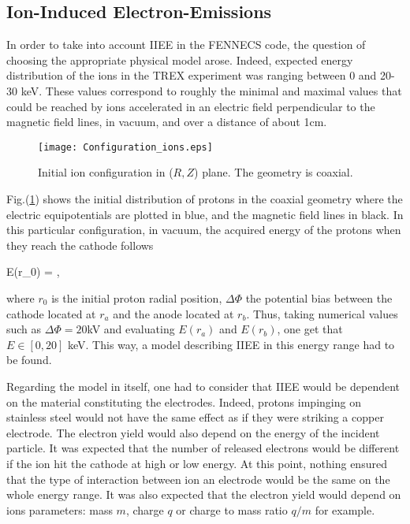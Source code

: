 \subsection{Ion-Induced Electron-Emissions}

In order to take into account IIEE in the FENNECS code, the question of choosing the appropriate physical model arose. Indeed, expected energy distribution of the ions in the TREX experiment was ranging between 0 and 20-30 keV. These values correspond to roughly the minimal and maximal values that could be reached by ions accelerated in an electric field perpendicular to the magnetic field lines, in vacuum, and over a distance of about 1cm.
 
\begin{figure}[h!]
\centering
	\texttt{[image: Configuration\_ions.eps]}
	\caption{\label{Config_ions} Initial ion configuration in ($R,Z$) plane. The geometry is coaxial.}
\end{figure}  

\noindent Fig.(\ref{Config_ions}) shows the initial distribution of protons in the coaxial geometry where the electric equipotentials are plotted in blue, and the magnetic field lines in black. In this particular configuration, in vacuum, the acquired energy of the protons when they reach the cathode follows 

\beq
E(r_0) = \Delta \Phi {},      
\eeq

\noindent where $r_0$ is the initial proton radial position, $\Delta \Phi$ the potential bias between the cathode located at $r_a$ and the anode located at $r_b$. Thus, taking numerical values such as $\Delta \Phi = 20$kV and evaluating $E(r_a)$ and $E(r_b)$, one get that $E\in [0,20]$ keV. This way, a model describing IIEE in this energy range had to be found. 

\noindent Regarding the model in itself, one had to consider that IIEE would be dependent on the material constituting the electrodes. Indeed, protons impinging on stainless steel would not have the same effect as if they were striking a copper electrode. The electron yield would also depend on the energy of the incident particle. It was expected that the number of released electrons would be different if the ion hit the cathode at high or low energy. At this point, nothing ensured that the type of interaction between ion an electrode would be the same on the whole energy range. It was also expected that the electron yield would depend on ions parameters: mass $m$, charge $q$ or charge to mass ratio $q/m$ for example.\\


